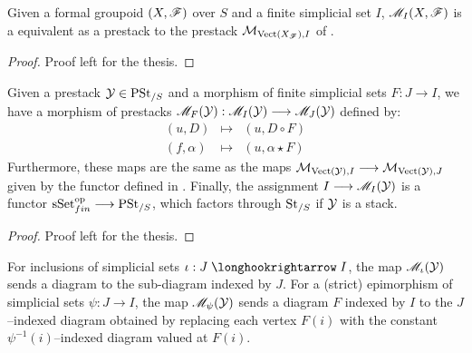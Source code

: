 \documentclass[11pt]{amsart}
\begin{document}
\begin{thm}
Given a formal groupoid $(X, \mathscr{F})$ over $S$ and a finite simplicial set $I$,
$\mathscr{M}_I(X ,\mathscr{F})$ is a equivalent as a prestack to the prestack
$\mathcal{M}_{\mathrm{Vect}(X_\mathscr{F}), I}$ of \cite[Definition 4.4]{ModQuivBun}.
\end{thm}
\begin{proof}
Proof left for the thesis.
\end{proof}

\begin{thm}\label{thm:categorification}
Given a prestack $\mathcal{Y} \in \mathrm{PSt}_{/S}$ and a morphism of finite simplicial sets
$F : J \to I$, we have a morphism of prestacks
$\sM_F(\mcY) : \sM_I(\mcY) \to \sM_J(\mcY)$ defined by:
\[\begin{array}{ccc}
(u, D) & \mapsto & (u, D \circ F) \\
(f, \alpha) & \mapsto & (u, \alpha \star F)
\end{array}\]
Furthermore, these maps are the same as the maps
$\mcM_{\Vect(\mcY), I} \to \mcM_{\Vect(\mcY), J}$ given by the functor
defined in \cite[Definition 4.4]{ModQuivBun}.
Finally, the assignment $I \to \sM_I(\mcY)$ is a functor
$\sSet_{fin}^\op \to \PSt_{/S}$, which factors through $\mathrm{St}_{/S}$
if $\mathcal{Y}$ is a stack.
\end{thm}
\begin{proof}
Proof left for the thesis.
\end{proof}

\begin{rmk}
For inclusions of simplicial sets $\iota : J \hto I$, the
map $\mathscr{M}_\iota(\mathcal{Y})$ sends a diagram to the sub-diagram indexed by $J$.
For a (strict) epimorphism of simplicial sets $\psi : J \to I$, the map
$\mathscr{M}_\psi(\mathcal{Y})$ sends a diagram $F$ indexed by $I$ to the $J$--indexed diagram
obtained by replacing each vertex $F(i)$ with the
constant $\psi^{-1}(i)$--indexed diagram valued at $F(i)$.
\end{rmk}
\end{document}
